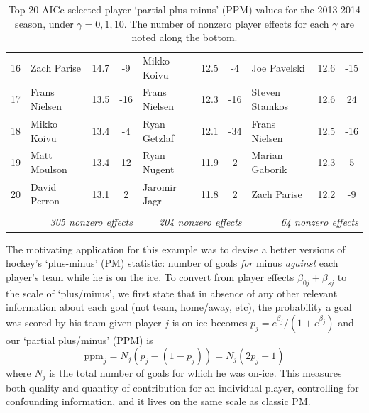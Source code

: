 \documentclass[12pt]{article}
\newcommand{\mr}[1]{\mathrm{#1}}
\begin{document}
\begin{table}[tb]
{\begin{tabular}{l|lcc|lcc|lcc|}
16 & Zach Parise & 14.7 & -9 & Mikko Koivu & 12.5 & -4 & Joe Pavelski & 12.6 & -15 \\
17 & Frans Nielsen & 13.5 & -16 & Frans Nielsen & 12.3 & -16 & Steven Stamkos & 12.6 & 24 \\
18 & Mikko Koivu & 13.4 & -4 & Ryan Getzlaf & 12.1 & -34 & Frans Nielsen & 12.5 & -16 \\
19 & Matt Moulson & 13.4 & 12 & Ryan Nugent & 11.9 & 2 & Marian Gaborik & 12.3 & 5 \\
20 & David Perron & 13.1 & 2 & Jaromir Jagr & 11.8 & 2 & Zach Parise & 12.2 & -9 \\
\multicolumn{1}{c}{} & \multicolumn{3}{r|}{} & \multicolumn{3}{r|}{} &  \multicolumn{3}{r|}{}\\
 \multicolumn{1}{c}{} & \multicolumn{3}{r|}{\it 305 nonzero effects} & \multicolumn{3}{r|}{\it 204 nonzero effects} &  \multicolumn{3}{r|}{\it 64 nonzero effects}
\end{tabular}}
\caption{\label{nhleffects} Top 20 AICc selected player `partial plus-minus' (PPM) values for the 2013-2014 season, under $\gamma = 0,1,10$.  The number of nonzero player effects for each $\gamma$ are noted along the bottom.}
\end{table}

The motivating application for this example was to devise a better versions of
hockey's `plus-minus' (PM) statistic: number of goals {\it for} minus {\it
against} each player's team while he is on the ice. To convert from player
effects $\beta_{0j} + \beta_{sj}$ to the scale of `plus/minus', we first state
that in absence of any other relevant information about each goal (not team,
home/away, etc), the probability a goal was scored by his team given player
$j$ is on ice becomes $p_j = e^{\beta_j}/(1+e^{\beta_j})$ and our `partial
plus/minus' (PPM) is \[ \mr{ppm}_j = N_j(p_j - (1-p_j)) = N_j(2p_j-1) \] where
$N_j$ is the total number of goals for which he was on-ice.  This measures both
quality and quantity of contribution for an individual player, controlling for
confounding information, and it lives on the same scale as classic PM.
\end{document}

